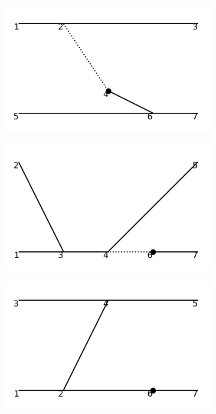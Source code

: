 \documentclass[11pt,a4paper,twoside,pdf]{article}
\numberwithin{equation}{section}
\begin{document}
\begin{figure}[h!]
\begin{subfigure}[t]{0.16\textwidth}
    \end{subfigure}
    \hfill
    \begin{subfigure}[t]{0.16\textwidth}
        \centering
        \includegraphics[width=\textwidth]{plots/order4_2to2/counterterms/13.png}
    \end{subfigure}
    \hfill
    \begin{subfigure}[t]{0.16\textwidth}
        \centering
        \includegraphics[width=\textwidth]{plots/order4_2to2/counterterms/14.png}
    \end{subfigure}
    \hfill
    \begin{subfigure}[t]{0.16\textwidth}
        \centering
        \includegraphics[width=\textwidth]{plots/order4_2to2/counterterms/15.png}

\end{subfigure}
\end{figure}
\end{document}
